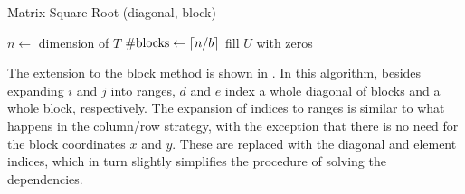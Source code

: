 \documentclass[../thesis]{subfiles}
\begin{document}
		\begin{algorithm}[htp]
			\caption{Matrix Square Root (diagonal, block)}
			\label{alg:multicore:diagonal:block}
			\DontPrintSemicolon


			$n \leftarrow$ dimension of $T$\;
			$\#\mathrm{blocks} \leftarrow \lceil n / b\rceil$\;
			fill $U$ with zeros\;

		\end{algorithm}

		The extension to the block method is shown in . In this algorithm, besides expanding $i$ and $j$ into ranges, $d$ and $e$ index a whole diagonal of blocks and a whole block, respectively. The expansion of indices to ranges is similar to what happens in the column/row strategy, with the exception that there is no need for the block coordinates $x$ and $y$. These are replaced with the diagonal and element indices, which in turn slightly simplifies the procedure of solving the dependencies.
\end{document}
